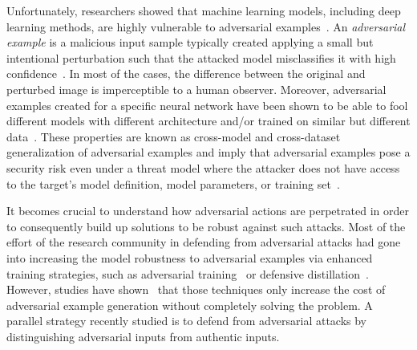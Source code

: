 Unfortunately, researchers showed that machine learning models, including deep learning methods, are highly vulnerable to adversarial examples~\cite{klarreich2016learning,goodfellow2014explaining,szegedy2013intriguing,papernot2016practical}.
An \emph{adversarial example} is a malicious input sample typically created applying a small but intentional perturbation such that the attacked model misclassifies it with high confidence~\cite{goodfellow2014explaining}.
In most of the cases, the difference between the original and perturbed image is imperceptible to a human observer.
Moreover, adversarial examples created for a specific neural network have been shown to be able to
fool different models with different architecture and/or trained on similar but different data~\cite{szegedy2013intriguing,papernot2016practical}.
These properties are known as cross-model and cross-dataset generalization of adversarial examples and imply that adversarial examples pose a security risk even under a threat model where the attacker does not have access to the target's model definition, model parameters, or training set~\cite{papernot2016practical,kurakin2016adversarial}.

It becomes crucial to understand how adversarial actions are perpetrated in order to consequently build up solutions to be robust against such attacks.
Most of the effort of the research community in defending from adversarial attacks had gone into increasing the model robustness to adversarial examples via enhanced training strategies, such as adversarial training~\cite{goodfellow2014explaining,papernot2016limitations} or defensive distillation~\cite{papernot2016distillation,grosse2016adversarial}.
However, studies have shown~\cite{papernot2016practical} that those techniques only increase the cost of adversarial example generation without completely solving the problem.
A parallel strategy recently studied is to defend from adversarial attacks by distinguishing adversarial inputs from authentic inputs.


